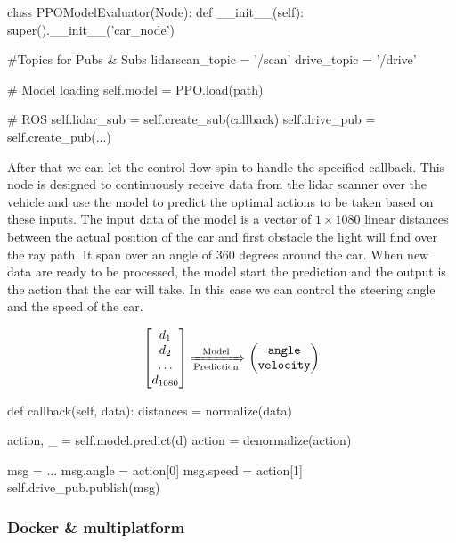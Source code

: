 \documentclass[conference]{IEEEtran}
\begin{document}
\begin{python}
class PPOModelEvaluator(Node):
  def __init__(self):
    super().__init__('car_node')

    #Topics for Pubs & Subs
    lidarscan_topic = '/scan'
    drive_topic = '/drive'

    # Model loading
    self.model = PPO.load(path)

    # ROS
    self.lidar_sub =
      self.create_sub(callback)
    self.drive_pub =
      self.create_pub(...)
\end{python}

After that we can let the control flow spin to handle the specified callback.
%
This node is designed to continuously receive data from the lidar scanner over the vehicle and use the model to predict the optimal actions to be taken based on these inputs.
%
The input data of the model is a vector of $ 1\times1080 $ linear distances between the actual position of the car and first obstacle the light will find over the ray path.
%
It span over an angle of 360 degrees around the car.
%
When new data are ready to be processed, the model start the prediction and the output is the action that the car will take.
%
In this case we can control the steering angle and the speed of the car.

\begin{equation*}
\begin{bmatrix}
    d_1\\
    d_2\\
    \dots\\
    d_{1080}
\end{bmatrix}
\xRightarrow[\text{Prediction}]{\text{Model}}
\begin{pmatrix}
    \texttt{angle}\\
    \texttt{velocity}
\end{pmatrix}
\end{equation*}

\medskip

\begin{python}
def callback(self, data):
  distances = normalize(data)

  action, _ = self.model.predict(d)
  action = denormalize(action)

  msg = ...
  msg.angle = action[0]
  msg.speed = action[1]
  self.drive_pub.publish(msg)
\end{python}

%
%
%
\subsubsection*{Docker \& multiplatform}
\end{document}
